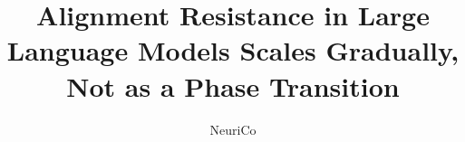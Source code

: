 \documentclass{article}
\title{Alignment Resistance in Large Language Models Scales Gradually, Not as a Phase Transition}
\author{NeuriCo}
\begin{document}
\maketitle

\begin{abstract}

\end{abstract}










\end{document}
